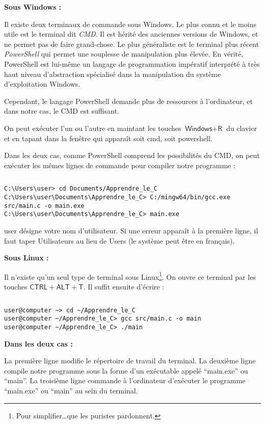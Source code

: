 \documentclass[../../main.tex]{subfiles}
\begin{document}
\textbf{Sous Windows :}

Il existe deux terminaux de commande sous Windows. Le plus connu et le moins utile est le terminal dit \textit{CMD}. Il est hérité des anciennes versions de Windows, et ne permet pas de faire grand-chose. Le plus généraliste est le terminal plus récent \textit{PowerShell} qui permet une souplesse de manipulation plus élevée. En vérité, PowerShell est lui-même un langage de programmation impératif interprété à très haut niveau d'abstraction spécialisé dans la manipulation du système d'exploitation Windows.

Cependant, le langage PowerShell demande plus de ressources à l'ordinateur, et dans notre cas, le CMD est suffisant.

On peut exécuter l'un ou l'autre en maintant les touches $\textsf{Windows} + \textsf{R}$ du clavier et en tapant dans la fenêtre qui apparaît soit \textsf{cmd}, soit \textsf{powershell}.

Dans les deux cas, comme PowerShell comprend les possibilités du CMD, on peut exécuter les mêmes lignes de commande pour compiler notre programme :
\begin{lstlisting}[title=Compiler sous Windows]
\end{lstlisting}
\begin{verbatim}
C:\Users\user> cd Documents/Apprendre_le_C
C:\Users\user\Documents\Apprendre_le_C> C:/mingw64/bin/gcc.exe src/main.c -o main.exe
C:\Users\user\Documents\Apprendre_le_C> main.exe
\end{verbatim}
\og user \fg{} désigne votre nom d'utilisateur. Si une erreur apparaît à la première ligne, il faut taper \textsf{Utilisateurs} au lieu de \textsf{Users} (le système peut être en français).

\textbf{Sous Linux :}

Il n'existe qu'un seul type de terminal sous Linux\footnote{Pour simplifier\dots que les puristes pardonnent.}. On ouvre ce terminal par les touches $\textsf{CTRL} + \textsf{ALT} + \textsf{T}$. Il suffit ensuite d'écrire :
\begin{lstlisting}[title=Compiler sous Linux]
\end{lstlisting}
\begin{verbatim}
user@computer ~> cd ~/Apprendre_le_C
user@computer ~/Apprendre_le_C> gcc src/main.c -o main
user@computer ~/Apprendre_le_C> ./main
\end{verbatim}
\textbf{Dans les deux cas :}

La première ligne modifie le répertoire de travail du terminal. \newline
La deuxième ligne compile notre programme sous la forme d'un exécutable appelé ``main.exe'' ou ``main''.\newline
La troisième ligne commande à l'ordinateur d'exécuter le programme ``main.exe'' ou ``main'' au sein du terminal.
\end{document}
